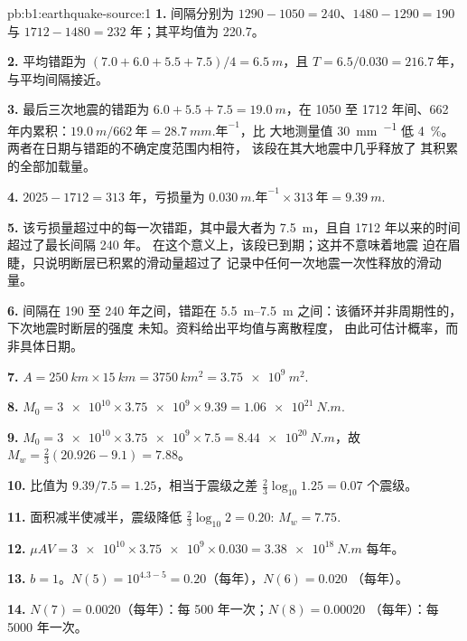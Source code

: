 \begin{solution}{pb:b1:earthquake-source:1}
\textbf{1.} 间隔分别为 $1290 - 1050 = 240$、$1480 - 1290 = 190$ 与
$1712 - 1480 = 232$ 年；其平均值为 \qty{220.7}{}。

\textbf{2.} 平均错距为 $(7.0 + 6.0 + 5.5 + 7.5)/4 = \qty{6.5}{m}$，且
$T = 6.5/0.030 = \qty{216.7}{\text{年}}$，与平均间隔接近。

\textbf{3.} 最后三次地震的错距为 $6.0 + 5.5 + 7.5 =
\qty{19.0}{m}$，在 1050 至 1712 年间、662 年内累积：$\qty{19.0}{m}
/\qty{662}{\text{年}} = \qty{28.7}{mm.\text{年}^{-1}}$，比
大地测量值 \qty{30}{mm.^{-1}} 低 \qty{4}{\percent}。两者在日期与错距的不确定度范围内相符，
该段在其大地震中几乎释放了
其积累的全部加载量。

\textbf{4.} $2025 - 1712 = 313$ 年，亏损量为
$\qty{0.030}{m.\text{年}^{-1}}\times\qty{313}{\text{年}} = \qty{9.39}{m}$.

\textbf{5.} 该亏损量超过中的每一次错距，其中最大者为
\qty{7.5}{m}，且自 1712 年以来的时间超过了最长间隔 240 年。
在这个意义上，该段已到期；这并不意味着地震
迫在眉睫，只说明断层已积累的滑动量超过了
记录中任何一次地震一次性释放的滑动量。

\textbf{6.} 间隔在 190 至 240 年之间，错距在
\qtyrange{5.5}{7.5}{m} 之间：该循环并非周期性的，下次地震时断层的强度
未知。资料给出平均值与离散程度，
由此可估计概率，而非具体日期。

\textbf{7.} $A = \qty{250}{km}\times\qty{15}{km} = \qty{3750}{km^2} =
\qty{3.75e9}{m^2}$.

\textbf{8.} $M_0 = \num{3e10}\times\num{3.75e9}\times\num{9.39} =
\qty{1.06e21}{N.m}$.

\textbf{9.} $M_0 = \num{3e10}\times\num{3.75e9}\times\num{7.5} =
\qty{8.44e20}{N.m}$，故 $M_w = \tfrac23(20.926 - 9.1) = 7.88$。

\textbf{10.} 比值为 $9.39/7.5 = 1.25$，相当于震级之差 $\tfrac23\log_{10}1.25 =
0.07$ 个震级。

\textbf{11.} 面积减半使减半，震级降低
$\tfrac23\log_{10}2 = 0.20$: $M_w = 7.75$.

\textbf{12.} $\mu A V = \num{3e10}\times\num{3.75e9}\times\num{0.030} =
\qty{3.38e18}{N.m}$ 每年。

\textbf{13.} $b = 1$。$N(5) = 10^{4.3 - 5} = 0.20$（每年），$N(6) = 0.020$
（每年）。

\textbf{14.} $N(7) = 0.0020$（每年）：每 500 年一次；$N(8) = 0.00020$
（每年）：每 \num{5000} 年一次。


\end{solution}
